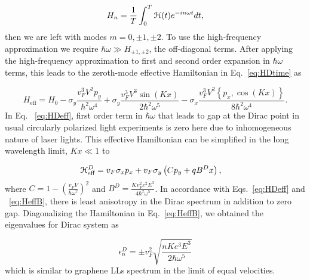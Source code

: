 \begin{equation} \label{eq:fourier-time-transform}
  H_n = \dfrac{1}{T} \int_{0}^{T} \mathcal{H}(t) e^{-in\omega t} dt,
\end{equation}
then we are left with modes $m=0,\pm1,\pm2$.
To use the high-frequency approximation we require $\hbar\omega \gg H_{\pm1,\pm2}$, the off-diagonal terms.
After applying the high-frequency approximation to first and second order expansion in $\hbar\omega$ terms, this leads to the zeroth-mode effective Hamiltonian in Eq.~\eqref{eq:HDtime} as

\begin{equation} \label{eq:HDeff}
  H_{\text{eff}}= H_{0}-\sigma_y\frac{v_F^3 V^2 p_y}{\hbar^{2}\omega^{4}}
  +\sigma_y\frac{v_F^3 V^{3}\sin{(Kx)}}{2\hbar^{2}\omega^{5}}
  -\sigma_x\frac{v_F^3 V^2 \left\{p_x, \cos{(Kx)} \right\} }{8\hbar^{2}\omega^{4}}.
\end{equation}
In Eq. ~\eqref{eq:HDeff}, first order term in $\hbar \omega$ that leads to gap at the Dirac point in usual circularly polarized light experiments \cite{YHW, JWM} is zero here due to inhomogeneous nature of laser lights.
This effective Hamiltonian can be simplified in the long wavelength limit, $Kx \ll 1$ to

\begin{align} \label{eq:HeffB}
  \mathcal{H}_{\text{eff}}^D &= v_{F}\sigma_{x}p_{x}+v_F\sigma_{y} \left( C p_{y} + qB^Dx \right),
\end{align}%
where $C = 1-\left(\tfrac{v_{F}V}{\hbar\omega^2}\right)^2$ and $B^D=\frac{Kv_F^2 e^2E^3}{4\hbar^{2}\omega^{5}}$.
In accordance with Eqs.~\eqref{eq:HDeff} and ~\eqref{eq:HeffB}, there is least anisotropy in the Dirac spectrum in addition to zero gap.
Diagonalizing the Hamiltonian in Eq.~\eqref{eq:HeffB}, we obtained the eigenvalues for Dirac system as%

\begin{equation} \label{eq:DiracEner}
  \epsilon_{n}^D = \pm v_F^2 \sqrt{\dfrac{nK e^3 E^3}{2 \hbar \omega^5}}
\end{equation}
which is similar to graphene LLs spectrum in the limit of equal velocities.

